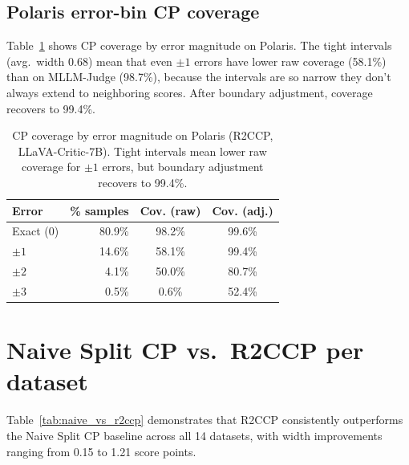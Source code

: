 \documentclass{article}
\begin{document}
\subsection{Polaris error-bin CP coverage}

Table~\ref{tab:polaris_error_bins} shows CP coverage by error magnitude on Polaris. The tight intervals (avg.\ width 0.68) mean that even $\pm 1$ errors have lower raw coverage (58.1\%) than on MLLM-Judge (98.7\%), because the intervals are so narrow they don't always extend to neighboring scores. After boundary adjustment, coverage recovers to 99.4\%.

\begin{table}[t]
\centering
\caption{CP coverage by error magnitude on Polaris (R2CCP, LLaVA-Critic-7B). Tight intervals mean lower raw coverage for $\pm 1$ errors, but boundary adjustment recovers to 99.4\%.}
\label{tab:polaris_error_bins}
\small
\begin{tabular}{lrcc}
\toprule
\textbf{Error} & \textbf{\% samples} & \textbf{Cov. (raw)} & \textbf{Cov. (adj.)} \\
\midrule
Exact (0) & 80.9\% & 98.2\% & 99.6\% \\
$\pm 1$ & 14.6\% & 58.1\% & 99.4\% \\
$\pm 2$ & 4.1\% & 50.0\% & 80.7\% \\
$\pm 3$ & 0.5\% & 0.6\% & 52.4\% \\
\bottomrule
\end{tabular}
\end{table}

\section{Naive Split CP vs.\ R2CCP per dataset}
\label{app:naive_vs_r2ccp}

Table~\ref{tab:naive_vs_r2ccp} demonstrates that R2CCP consistently outperforms the Naive Split CP baseline across all 14 datasets, with width improvements ranging from 0.15 to 1.21 score points.
\end{document}
